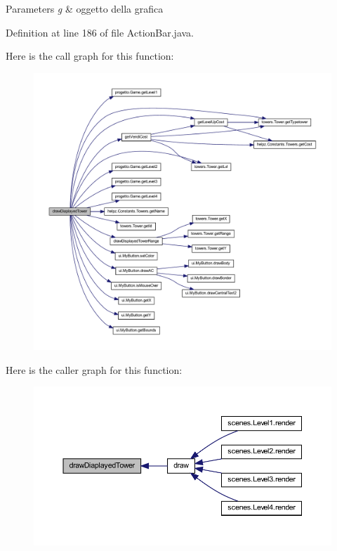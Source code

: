\begin{DoxyParams}{Parameters}
{\em g} & oggetto della grafica \\
\hline
\end{DoxyParams}


Definition at line 186 of file Action\+Bar.\+java.

Here is the call graph for this function\+:\nopagebreak
\begin{figure}[H]
\begin{center}
\leavevmode
\includegraphics[width=350pt]{classui_1_1_action_bar_a2177b06de4c0084e953665a7dbfd6772_cgraph}
\end{center}
\end{figure}
Here is the caller graph for this function\+:\nopagebreak
\begin{figure}[H]
\begin{center}
\leavevmode
\includegraphics[width=350pt]{classui_1_1_action_bar_a2177b06de4c0084e953665a7dbfd6772_icgraph}
\end{center}
\end{figure}
\mbox{\label{classui_1_1_action_bar_a04a438da46ac439f00343a12939ada6e}} 
